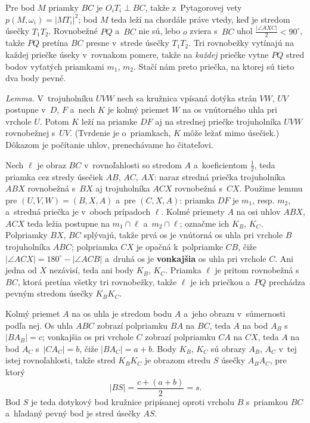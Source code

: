 {    Pre bod $M$ priamky $BC$ je $O_iT_i \perp BC$, takže z~Pytagorovej vety $p(M,\omega_i) = |MT_i|^2$; bod $M$ teda leží na chordále práve vtedy, keď je stredom úsečky $T_1T_2$. Rovnobežné $PQ$ a~$BC$ nie sú, lebo $o$ zviera s~$BC$ uhol $\frac{|\angle AXC|}{2} < 90^\circ$, takže $PQ$ pretína $BC$ presne v~strede úsečky $T_1T_2$. Tri rovnobežky vytínajú na každej priečke úseky v~rovnakom pomere, takže na \textit{každej} priečke vytne $PQ$ stred bodov vyťatých priamkami $m_1$, $m_2$. Stačí nám preto priečka, na ktorej sú tieto dva body pevné.

    \textit{Lemma.} V~trojuholníku $UVW$ nech sa kružnica vpísaná dotýka strán $VW$, $UV$ postupne v~$D$, $F$ a~nech $K$ je kolmý priemet $W$ na os vnútorného uhla pri vrchole $U$. Potom $K$ leží na priamke $DF$ aj na strednej priečke trojuholníka $UVW$ rovnobežnej s~$UV$. (Tvrdenie je o~priamkach, $K$ môže ležať mimo úsečiek.) Dôkazom je počítanie uhlov, prenechávame ho čitateľovi.

    Nech $\ell$ je obraz $BC$ v~rovnoľahlosti so stredom $A$ a~koeficientom $\frac12$, teda priamka cez stredy úsečiek $AB$, $AC$, $AX$: naraz stredná priečka trojuholníka $ABX$ rovnobežná s~$BX$ aj trojuholníka $ACX$ rovnobežná s~$CX$. Použime lemmu pre $(U,V,W) = (B,X,A)$ a~pre $(C,X,A)$: priamka $DF$ je $m_1$, resp. $m_2$, a~stredná priečka je v~oboch prípadoch $\ell$. Kolmé priemety $A$ na osi uhlov $ABX$, $ACX$ teda ležia postupne na $m_1 \cap \ell$ a~$m_2 \cap \ell$; označme ich $K_B$, $K_C$. Polpriamky $BX$, $BC$ splývajú, takže prvá os je vnútorná os uhla pri vrchole $B$ trojuholníka $ABC$; polpriamka $CX$ je opačná k~polpriamke $CB$, čiže $|\angle ACX| = 180^\circ - |\angle ACB|$ a~druhá os je \textbf{vonkajšia} os uhla pri vrchole $C$. Ani jedna od $X$ nezávisí, teda ani body $K_B$, $K_C$. Priamka $\ell$ je pritom rovnobežná s~$BC$, ktorá pretína všetky tri rovnobežky, takže $\ell$ je ich priečkou a~$PQ$ prechádza pevným stredom úsečky $K_BK_C$.

    Kolmý priemet $A$ na os uhla je stredom bodu $A$ a~jeho obrazu v~súmernosti podľa nej. Os uhla $ABC$ zobrazí polpriamku $BA$ na $BC$, teda $A$ na bod $A_B$ s~$|BA_B| = c$; vonkajšia os pri vrchole $C$ zobrazí polpriamku $CA$ na $CX$, teda $A$ na bod $A_C$ s~$|CA_C| = b$, čiže $|BA_C| = a+b$. Body $K_B$, $K_C$ sú obrazy $A_B$, $A_C$ v~tej istej rovnoľahlosti, takže stred $K_BK_C$ je obrazom stredu $S$ úsečky $A_BA_C$, pre ktorý
    $$
    |BS| = \frac{c + (a+b)}{2} = s.
    $$
    Bod $S$ je teda dotykový bod kružnice pripísanej oproti vrcholu $B$ s~priamkou $BC$ a~hľadaný pevný bod je stred úsečky $AS$.
}

\DisplayHints

\DisplayProblemSolutions

\bye
